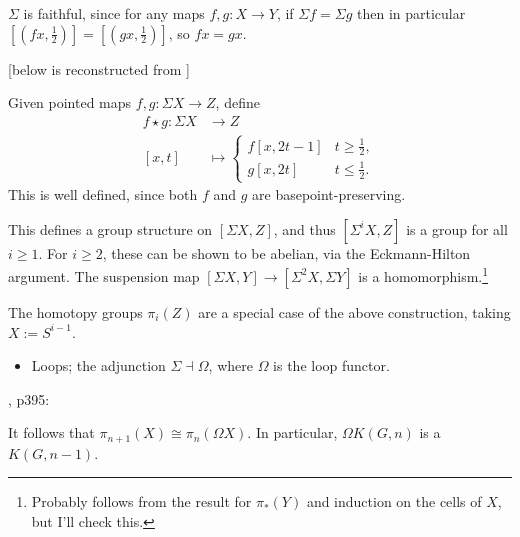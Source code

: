 \documentclass{MetricNotes2023}
\begin{document}
\begin{remark}\label{2502141442}
\(\Sigma\) is faithful, since for any maps \(f, g : X\to Y\), if \(\Sigma f = \Sigma g\) then in particular \([(fx, \frac{1}{2})]=[(gx, \frac{1}{2})]\), so \(fx=gx\). 
\end{remark}  

[below is reconstructed from  \autocite{mazelgee}]

Given pointed maps \(f, g : \Sigma X \to Z\), define 
\begin{align*}
f \star g : \Sigma X &\to Z\\
[x,t]&\mapsto \begin{cases}
f[x,2t-1] & t \geq \frac{1}{2},\\
g[x,2t] &t\leq \frac{1}{2}.
\end{cases}
\end{align*}
This is well defined, since both \(f\) and \(g\) are basepoint-preserving. %

\begin{remark}\label{2504091052}
This defines a group structure on \([\Sigma X, Z]\), and thus \([\Sigma^i X, Z]\) is a group for all \(i\geq 1\). For \(i\geq 2\), these can be shown to be abelian, via the Eckmann-Hilton argument. The suspension map \([\Sigma X, Y]\to [\Sigma^2X, \Sigma Y]\) is a homomorphism.\footnote{Probably follows from the result for \(\pi_*(Y)\) and induction on the cells of \(X\), but I'll check this.}
\end{remark}

\begin{remark}\label{2502200937}
The homotopy groups \(\pi_i(Z)\) are a special case of the above construction, taking \(X:=S^{i-1}\). 
\end{remark}


\begin{itemize}
\item Loops; the adjunction \(\Sigma \dashv \Omega\), where \(\Omega\) is the loop functor.
\end{itemize}

\autocite{hatcher}, p395:

\begin{remark}
It follows that \(\pi_{n+1}(X)\cong \pi_n(\Omega X)\). In particular, \(\Omega K(G, n)\) is a \newline\(K(G, n-1)\). 
\end{remark}
\end{document}
